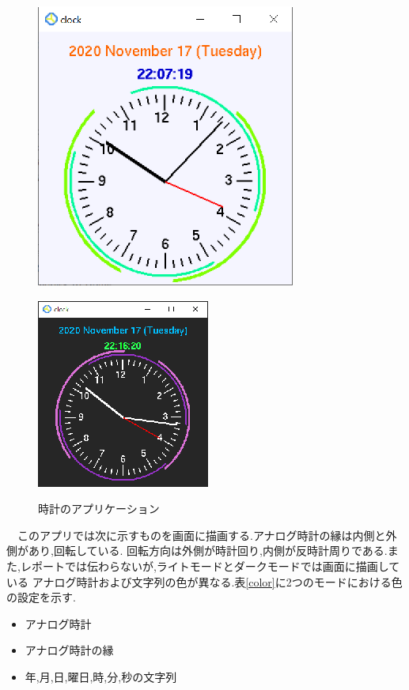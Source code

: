 \documentclass[a4j]{jarticle}
\begin{document}
        \begin{figure}[H]
          \begin{minipage}{0.5\hsize}
           \begin{center}
            \includegraphics[scale=1.2]{light.eps}
           \end{center}
           \label{light}
          \end{minipage}
          \begin{minipage}{0.5\hsize}
           \begin{center}
            \includegraphics[scale=1.8]{dark.eps}
           \end{center}
           \label{dark}
          \end{minipage}
          \caption{時計のアプリケーション}
          \label{clock}
         \end{figure}

         　このアプリでは次に示すものを画面に描画する.アナログ時計の縁は内側と外側があり,回転している.
         回転方向は外側が時計回り,内側が反時計周りである.また,レポートでは伝わらないが,ライトモードとダークモードでは画面に描画している
         アナログ時計および文字列の色が異なる.表\ref{color}に2つのモードにおける色の設定を示す.
         \begin{itemize}
           \item アナログ時計
           \item アナログ時計の縁
           \item 年,月,日,曜日,時,分,秒の文字列 
         \end{itemize}
\end{document}
